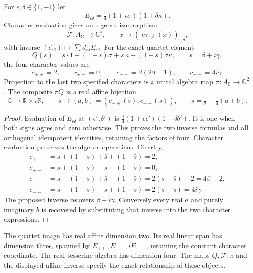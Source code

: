 \begin{proposition}
\label{prop:sz-quartet-coordinates}
For $\epsilon,\delta\in\{1,-1\}$ let
\[
E_{\epsilon\delta}=\tfrac14(1+\epsilon\sigma)(1+\delta\kappa).
\]
Character evaluation gives an algebra isomorphism
\[
\mathcal F:A_{\mathbb C}\to\mathbb C^4,\qquad
x\mapsto(\operatorname{ev}_{\epsilon,\delta}(x))_{\epsilon,\delta},
\]
with inverse $(d_{\epsilon\delta})\mapsto\sum d_{\epsilon\delta}E_{\epsilon\delta}$.
For the exact quartet element
\[
Q(s)=s\cdot1+(1-s)\sigma+\bar s\,\kappa+(1-\bar s)\sigma\kappa,\qquad s=\beta+i\gamma,
\]
the four character values are
\[
c_{++}=2,\qquad c_{+-}=0,\qquad c_{-+}=2(2\beta-1),\qquad c_{--}=4i\gamma.
\]
Projection to the last two specified characters is a unital algebra map $\pi:A_{\mathbb C}\to\mathbb C^2$. The composite $\pi Q$ is a real affine bijection
\[
\mathbb C\to\mathbb R\times i\mathbb R,\qquad
s\mapsto(a,b)=(c_{-+}(s),c_{--}(s)),\qquad s=\tfrac12+\tfrac14(a+b).
\]
\end{proposition}
\begin{proof}
Evaluation of $E_{\epsilon\delta}$ at $(\epsilon',\delta')$ is $\tfrac14(1+\epsilon\epsilon')(1+\delta\delta')$. It is one when both signs agree and zero otherwise. This proves the two inverse formulas and all orthogonal idempotent identities, retaining the factors of four. Character evaluation preserves the algebra operations. Directly,
\[
\begin{aligned}
c_{++}&=s+(1-s)+\bar s+(1-\bar s)=2,\\
c_{+-}&=s+(1-s)-\bar s-(1-\bar s)=0,\\
c_{-+}&=s-(1-s)+\bar s-(1-\bar s)=2(s+\bar s)-2=4\beta-2,\\
c_{--}&=s-(1-s)-\bar s+(1-\bar s)=2(s-\bar s)=4i\gamma.
\end{aligned}
\]
The proposed inverse recovers $\beta+i\gamma$. Conversely every real $a$ and purely imaginary $b$ is recovered by substituting that inverse into the two character expressions.
\end{proof}

The quartet image has real affine dimension two. Its real linear span has dimension three, spanned by $E_{++},E_{-+},iE_{--}$, retaining the constant character coordinate. The real tesserine algebra has dimension four. The maps $Q,\mathcal F,\pi$ and the displayed affine inverse specify the exact relationship of these objects.

